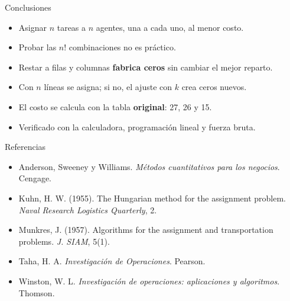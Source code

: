 \documentclass[aspectratio=169]{beamer}
\begin{document}
\begin{frame}{Conclusiones}
  \begin{itemize}\setlength{\itemsep}{0.6em}
    \item Asignar $n$ tareas a $n$ agentes, una a cada uno, al menor costo.
    \item Probar las $n!$ combinaciones no es práctico.
    \item Restar a filas y columnas \textbf{fabrica ceros} sin cambiar el mejor reparto.
    \item Con $n$ líneas se asigna; si no, el ajuste con $k$ crea ceros nuevos.
    \item El costo se calcula con la tabla \textbf{original}: 27, 26 y 15.
    \item Verificado con la calculadora, programación lineal y fuerza bruta.
  \end{itemize}
\end{frame}

\begin{frame}{Referencias}
  \small
  \begin{itemize}\setlength{\itemsep}{0.4em}
    \item Anderson, Sweeney y Williams. \textit{Métodos cuantitativos para los negocios}. Cengage.
    \item Kuhn, H. W. (1955). The Hungarian method for the assignment problem. \textit{Naval Research Logistics Quarterly}, 2.
    \item Munkres, J. (1957). Algorithms for the assignment and transportation problems. \textit{J. SIAM}, 5(1).
    \item Taha, H. A. \textit{Investigación de Operaciones}. Pearson.
    \item Winston, W. L. \textit{Investigación de operaciones: aplicaciones y algoritmos}. Thomson.
  \end{itemize}
\end{frame}
\end{document}
